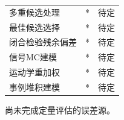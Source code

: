\begin{table}[htbp]
\begin{threeparttable}[c]
\begin{tabular}{lcc}
      \quad 多重候选处理 & * & 待定 \\
      \quad 最佳候选选择 & * & 待定 \\
      \quad 闭合检验残余偏差 & * & 待定 \\
      \quad 信号MC建模 & * & 待定 \\
      \quad 运动学重加权 & * & 待定 \\
      \quad 事例堆积建模 & * & 待定 \\
      \bottomrule
    \end{tabular}
    \begin{tablenotes}
      \item[*] 尚未完成定量评估的误差源。
    \end{tablenotes}
  \end{threeparttable}
\end{table}
